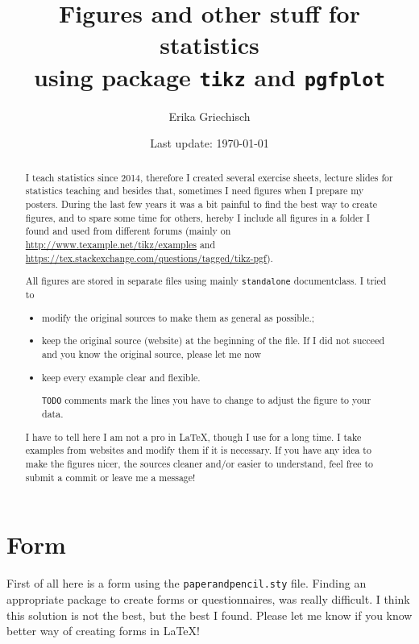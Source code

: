 \documentclass[a4paper]{article}
\title{Figures and other stuff for statistics\\ using package \texttt{tikz} and \texttt{pgfplot}}
\author{Erika Griechisch}
\date{\small Last update: \today}
\begin{document}
\maketitle
\thispagestyle{empty}
	\begin{abstract}
	I teach statistics since 2014, therefore I created several exercise sheets, lecture slides for statistics teaching and besides that, sometimes I need figures when I prepare my posters. During the last few years it was a bit painful to find the best way to create figures, and to spare some time for others, hereby I include all figures in a folder I found and used from different forums (mainly on \url{http://www.texample.net/tikz/examples} and \url{https://tex.stackexchange.com/questions/tagged/tikz-pgf}). 
	

	All figures are stored in separate files using mainly \texttt{standalone} documentclass. I tried to 
	\begin{itemize}
	\item modify the original sources to make them as general as possible.;
	\item keep the original source (website) at the beginning of the file. 
		If I did not succeed and you know the original source, please let me now
	\item keep every example clear and flexible.
	
		 \texttt{TODO} comments mark the lines you have to change to adjust the figure to your data. 
	\end{itemize}

	I have to tell here I am not a pro in \LaTeX, though I use for a long time. I take examples from websites and modify them if it is necessary. If you have any idea to make the figures nicer, the sources cleaner and/or easier to understand, feel free to submit a commit or leave me a message!
	

	\end{abstract}
	
	\tableofcontents
	\clearpage
	
	\section{Form}
	
	First of all here is a form using the \texttt{paperandpencil.sty} file. 
	Finding an appropriate package to create forms or questionnaires, was really difficult. 
	I think this solution is not the best, but the best I found.
	Please let me know if you know better way of creating forms in \LaTeX{}!
	\vfill
	
\end{document}
